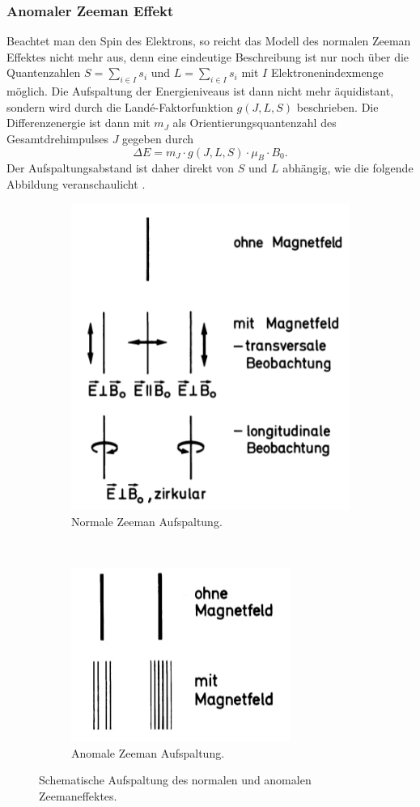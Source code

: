 \subsubsection*{Anomaler Zeeman Effekt}
	Beachtet man den Spin des Elektrons, so reicht das Modell des normalen Zeeman Effektes nicht mehr aus, denn eine eindeutige Beschreibung ist nur noch über die Quantenzahlen $S = \sum_{i\in I}s_i$ und $L = \sum_{i\in I}s_i$ mit $I$ Elektronenindexmenge möglich. Die Aufspaltung der Energieniveaus ist dann nicht mehr äquidistant, sondern wird durch die Landé-Faktorfunktion $g(J,L,S)$ beschrieben. Die Differenzenergie ist dann mit $m_J$ als Orientierungsquantenzahl des Gesamtdrehimpulses $J$ gegeben durch
	\[
		\Delta E = m_J\cdot g(J,L,S)\cdot\mu_B\cdot B_0.
	\]
	Der Aufspaltungsabstand ist daher direkt von $S$ und $L$ abhängig, wie die folgende Abbildung veranschaulicht \cite[p.219]{HakenWolf}.
	\begin{figure}[H]
		\centering
		\begin{subfigure}[b]{0.4\textwidth}
			\centering
			\includegraphics[heigh=5cm]{Bilddateien/Grundlagen/NormalZeemanAufspaltung.png}
			\caption{Normale Zeeman Aufspaltung.}
			\label{fig:NormalZeemanAufspaltung}
		\end{subfigure}
		\
		\begin{subfigure}[b]{0.4\textwidth}
			\centering
			\includegraphics[heigh=5cm]{Bilddateien/Grundlagen/AnomalZeemanAufspaltung.png}
			\caption{Anomale Zeeman Aufspaltung.}
			\label{fig:AnomaleZeemanAufspaltung}
		\end{subfigure}
		\caption{Schematische Aufspaltung des normalen und anomalen Zeemaneffektes.}
	\end{figure}

